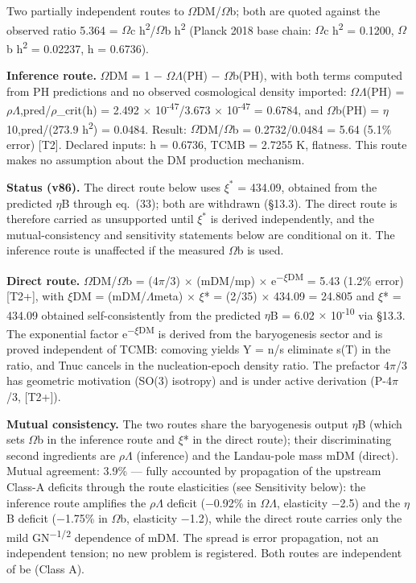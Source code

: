 \documentclass[11pt,letterpaper]{article}
\begin{document}
\noindent Two partially independent routes to $\Omega$DM/$\Omega$b; both are quoted against the observed ratio 5.364 = $\Omega$c h\textsuperscript{2}/$\Omega$b h\textsuperscript{2} (Planck 2018 base chain: $\Omega$c h\textsuperscript{2} = 0.1200, $\Omega$b h\textsuperscript{2} = 0.02237, h = 0.6736).

\noindent \textbf{Inference route. }$\Omega$DM = 1 $-$ $\Omega$$\Lambda$(PH) $-$ $\Omega$b(PH), with both terms computed from PH predictions and no observed cosmological density imported: $\Omega$$\Lambda$(PH) = $\rho$$\Lambda$,pred/$\rho$\_crit(h) = 2.492 $\times$ 10\textsuperscript{-47}/3.673 $\times$ 10\textsuperscript{-47} = 0.6784, and $\Omega$b(PH) = $\eta$10,pred/(273.9 h\textsuperscript{2}) = 0.0484. Result: $\Omega$DM/$\Omega$b = 0.2732/0.0484 = 5.64 (5.1\% error) [T2]. Declared inputs: h = 0.6736, TCMB = 2.7255 K, flatness. This route makes no assumption about the DM production mechanism.

\noindent \textbf{Status (v86). }The direct route below uses $\xi^*$ = 434.09, obtained from the predicted $\eta$B through eq.~(33); both are withdrawn (§13.3). The direct route is therefore carried as unsupported until $\xi^*$ is derived independently, and the mutual-consistency and sensitivity statements below are conditional on it. The inference route is unaffected if the measured $\Omega$b is used.

\noindent \textbf{Direct route. }$\Omega$DM/$\Omega$b = (4$\pi$/3) $\times$ (mDM/mp) $\times$ e\textsuperscript{$-$$\xi$DM} = 5.43 (1.2\% error) [T2+], with $\xi$DM = (mDM/$\Lambda$meta) $\times$ $\xi$* = (2/35) $\times$ 434.09 = 24.805 and $\xi$* = 434.09 obtained self-consistently from the predicted $\eta$B = 6.02 $\times$ 10\textsuperscript{-10} via §13.3. The exponential factor e\textsuperscript{$-$$\xi$DM} is derived from the baryogenesis sector and is proved independent of TCMB: comoving yields Y = n/s eliminate s(T) in the ratio, and Tnuc cancels in the nucleation-epoch density ratio. The prefactor 4$\pi$/3 has geometric motivation (SO(3) isotropy) and is under active derivation (P-4$\pi$/3, [T2+]).

\noindent \textbf{Mutual consistency. }The two routes share the baryogenesis output $\eta$B (which sets $\Omega$b in the inference route and $\xi$* in the direct route); their discriminating second ingredients are $\rho$$\Lambda$ (inference) and the Landau-pole mass mDM (direct). Mutual agreement: 3.9\% --- fully accounted by propagation of the upstream Class-A deficits through the route elasticities (see Sensitivity below): the inference route amplifies the $\rho$$\Lambda$ deficit ($-$0.92\% in $\Omega$$\Lambda$, elasticity $-$2.5) and the $\eta$B deficit ($-$1.75\% in $\Omega$b, elasticity $-$1.2), while the direct route carries only the mild GN\textsuperscript{$-$1/2} dependence of mDM. The spread is error propagation, not an independent tension; no new problem is registered. Both routes are independent of be (Class A).
\end{document}

